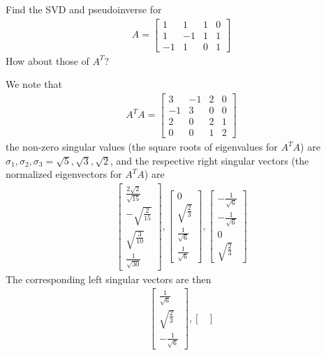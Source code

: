 \begin{Exercise}
Find the SVD and pseudoinverse for
\begin{align*}
A = \begin{bmatrix}
1&1&1&0\\ 
1&-1&1&1\\ 
-1&1&0&1
\end{bmatrix}
\end{align*}
How about those of $A^T$?
\end{Exercise}
\begin{Answer}
We note that 
\begin{align*}
A^TA = 
\begin{bmatrix}
3&-1&2&0\\
-1&3&0&0\\ 
2&0&2&1\\ 
0&0&1&2
\end{bmatrix}
\end{align*}
the non-zero singular values (the square roots of eigenvalues for $A^TA$) are $\sigma_1, \sigma_2, \sigma_3 = \sqrt{5}, \sqrt{3}, \sqrt{2}$, and the respective right singular vectors (the normalized eigenvectors for $A^TA$) are
\begin{align*}
\begin{bmatrix}
\frac{2\sqrt{2}}{\sqrt{15}}\\ 
-\sqrt{\frac{2}{15}}\\ 
\sqrt{\frac{3}{10}}\\ 
\frac{1}{\sqrt{30}}
\end{bmatrix},
\begin{bmatrix}
0\\ 
\sqrt{\frac{2}{3}}\\ 
\frac{1}{\sqrt{6}}\\ 
\frac{1}{\sqrt{6}}
\end{bmatrix},
\begin{bmatrix}
-\frac{1}{\sqrt{6}}\\ 
-\frac{1}{\sqrt{6}}\\ 
0\\ 
\sqrt{\frac{2}{3}}
\end{bmatrix}
\end{align*}
The corresponding left singular vectors are then
\begin{align*}
\begin{bmatrix}
\frac{1}{\sqrt{6}}\\ 
\sqrt{\frac{2}{3}}\\ 
-\frac{1}{\sqrt{6}}
\end{bmatrix},
\begin{bmatrix}

\end{bmatrix}
\end{align*}
\end{Answer}
